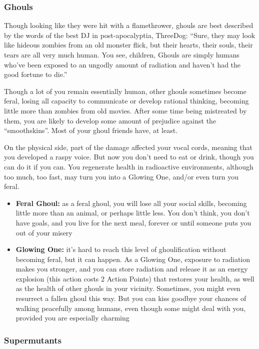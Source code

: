 \documentclass[11pt]{article} %
\begin{document}
\subsubsection{Ghouls}

Though looking like they were hit with a flamethrower, ghouls are best described by the words of the best DJ in post-apocalyptia, ThreeDog: ``Sure, they may look like hideous zombies from an old monster flick, but their hearts, their souls, their tears are all very much human. You see, children, Ghouls are simply humans who've been exposed to an ungodly amount of radiation and haven't had the good fortune to die.'' 

Though a lot of you remain essentially human, other ghouls sometimes become feral, losing all capacity to communicate or develop rational thinking, becoming little more than zombies from old movies. After some time being mistreated by them, you are likely to develop some amount of prejudice against the ``smoothskins''. Most of your ghoul friends have, at least.

On the physical side, part of the damage affected your vocal cords, meaning that you developed a raspy voice. But now you don't need to eat or drink, though you can do it if you can. You regenerate health in radioactive environments, although too much, too fast, may turn you into a Glowing One, and/or even turn you feral. 

\begin{itemize}
	\item \textbf{Feral Ghoul:} as a feral ghoul, you will lose all your social skills, becoming little more than an animal, or perhaps little less. You don't think, you don't have goals, and you live for the next meal, forever or until someone puts you out of your misery
	\item \textbf{Glowing One:} it's hard to reach this level of ghoulification without becoming feral, but it can happen. As a Glowing One, exposure to radiation makes you stronger, and you can store radiation and release it as an energy explosion (this action costs 2 Action Points) that restores your health, as well as the health of other ghouls in your vicinity. Sometimes, you might even resurrect a fallen ghoul this way. But you can kiss goodbye your chances of walking peacefully among humans, even though some might deal with you, provided you are especially charming
\end{itemize}

\subsubsection{Supermutants} 
\end{document}
